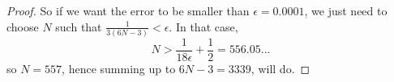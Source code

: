 \documentclass[12pt]{article}
\begin{document}
\begin{proof}
So if we want the error to be smaller than $\epsilon = 0.0001$, we just need to choose $N$ such that $\frac{1}{3 (6N - 3)} < \epsilon$. In that case,
$$N > \frac{1}{18\epsilon} + \frac{1}{2} = 556.05...$$
so $N = 557$, hence summing up to $6N - 3 = 3339$, will do.



\end{proof}

\unless\ifdefined\IsMainDocument
\end{document}
